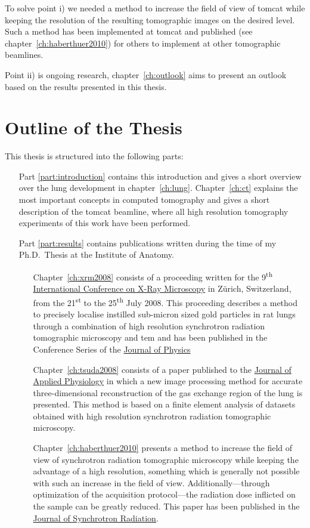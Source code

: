 To solve point i) we needed a method to increase the field of view of \ac{tomcat} while keeping the resolution of the resulting tomographic images on the desired level. Such a method has been implemented at \ac{tomcat} and published (see chapter~\ref{ch:haberthuer2010}) for others to implement at other tomographic beamlines.

Point ii) is ongoing research, chapter~\ref{ch:outlook} aims to present an outlook based on the results presented in this thesis. 

\section{Outline of the Thesis}
This thesis is structured into the following parts:
\begin{itemize}
	\item [Part \ref{part:introduction}] contains this introduction and gives a short overview over the lung development in chapter~\ref{ch:lung}. Chapter~\ref{ch:ct} explains the most important concepts in computed tomography and gives a short description of the \acf{tomcat} beamline, where all high resolution tomography experiments of this work have been performed.
	\item [Part \ref{part:results}] contains publications written during the time of my Ph.D.\ Thesis at the Institute of Anatomy.
	\begin{itemize}
		\item [Chapter~\ref{ch:xrm2008}] consists of a proceeding written for the 9\textsuperscript{th} \href{http://xrm2008.web.psi.ch/}{International Conference on X-Ray Microscopy} in Zürich, Switzerland, from the 21\textsuperscript{st} to the 25\textsuperscript{th} July 2008. This proceeding describes a method to precisely localise instilled sub-micron sized gold particles in rat lungs through a combination of high resolution synchrotron radiation tomographic microscopy and \acl{tem} and has been published in the Conference Series of the \href{http://iopscience.iop.org/1742-6596/}{Journal of Physics}
		\item [Chapter~\ref{ch:tsuda2008}] consists of a paper published to the \href{http://jap.physiology.org/}{Journal of Applied Physiology} in which a new image processing method for accurate three-dimensional reconstruction of the gas exchange region of the lung is presented. This method is based on a finite element analysis of datasets obtained with high resolution synchrotron radiation tomographic microscopy.
		\item [Chapter~\ref{ch:haberthuer2010}] presents a method to increase the field of view of synchrotron radiation tomographic microscopy while keeping the advantage of a high resolution, something which is generally not possible with such an increase in the field of view. Additionally---through optimization of the acquisition protocol---the radiation dose inflicted on the sample can be greatly reduced. This paper has been published in the \href{http://journals.iucr.org/s/}{Journal of Synchrotron Radiation}.

\end{itemize}
\end{itemize}
